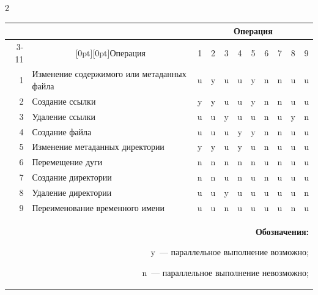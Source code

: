 \begin{multicols}{2}
\begin{table}
\begin{center}




\vspace*{2ex}







\begin{tabular}{|rl|c|c|c|c|c|c|c|c|c|}


\hline


&&\multicolumn{9}{c|}{Операция}\\


\cline{3-11}


&\multicolumn{1}{c|}{\raisebox{6pt}[0pt][0pt]{Операция}}&1&2&3&4&5&6&7&8&9\\


\hline


1&Изменение содержимого или метаданных файла&u&y&u&u&y&n&n&u&u\\


2&Создание ссылки&y&y&u&u&y&n&n&u&u\\


3&Удаление ссылки&u&u&y&u&u&n&u&y&n\\


4&Создание файла    &u&u&u&y&y&n&n&u&u\\


5&Изменение метаданных директории&y&y&u&y&u&n&u&u&u\\


6&Перемещение дуги&n&n&n&n&n&u&n&u&u\\


7&Создание директории&n&n&u&n&u&n&u&u&u\\


8&Удаление директории&u&u&y&u&u&u&u&u&n\\


9&Переименование временного имени&u&u&n&u&u&u&u&n&u\\


\hline


\multicolumn{11}{p{128mm}}{\footnotesize{\textbf{Обозначения:}\newline


y~--- параллельное выполнение возможно;\newline


n~--- параллельное выполнение невозможно; \newline


}}
\end{tabular}
\end{center}
\end{table}
\end{multicols}

